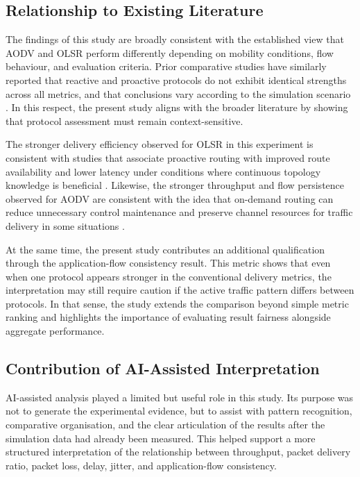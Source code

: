 \documentclass{Academic}
\begin{document}
\subsection{Relationship to Existing Literature}

The findings of this study are broadly consistent with the established view that AODV and OLSR perform differently depending on mobility conditions, flow behaviour, and evaluation criteria. Prior comparative studies have similarly reported that reactive and proactive protocols do not exhibit identical strengths across all metrics, and that conclusions vary according to the simulation scenario \parencite{spaho2013,sallam2015,sallum2018,wang2022}. In this respect, the present study aligns with the broader literature by showing that protocol assessment must remain context-sensitive.

The stronger delivery efficiency observed for OLSR in this experiment is consistent with studies that associate proactive routing with improved route availability and lower latency under conditions where continuous topology knowledge is beneficial \parencite{spaho2013,radha2018,wheeb2023}. Likewise, the stronger throughput and flow persistence observed for AODV are consistent with the idea that on-demand routing can reduce unnecessary control maintenance and preserve channel resources for traffic delivery in some situations \parencite{midha2013,bappalige2020}.

At the same time, the present study contributes an additional qualification through the application-flow consistency result. This metric shows that even when one protocol appears stronger in the conventional delivery metrics, the interpretation may still require caution if the active traffic pattern differs between protocols. In that sense, the study extends the comparison beyond simple metric ranking and highlights the importance of evaluating result fairness alongside aggregate performance.

\subsection{Contribution of AI-Assisted Interpretation}

AI-assisted analysis played a limited but useful role in this study. Its purpose was not to generate the experimental evidence, but to assist with pattern recognition, comparative organisation, and the clear articulation of the results after the simulation data had already been measured. This helped support a more structured interpretation of the relationship between throughput, packet delivery ratio, packet loss, delay, jitter, and application-flow consistency.
\end{document}
